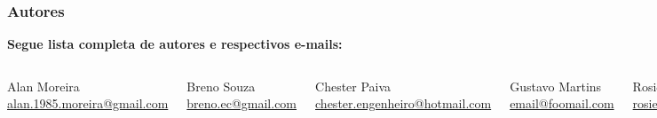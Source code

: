 
\begin{frame}
  \frametitle{Autores}

  \begin{alertblock}{}
    \vspace{5mm}

    \normalsize{\textbf{Segue lista completa de autores e respectivos e-mails:}}
    \vspace{5mm}

    \begin{columns}
      \centering
      \normalsize{Alan Moreira}
      \scriptsize{\href{mailto:alan.1985.moreira@gmail.com}{alan.1985.moreira@gmail.com}}
      \vspace{5mm}

      \normalsize{Breno Souza}
      \scriptsize{\href{mailto:breno.ec@gmail.com}{breno.ec@gmail.com}}
      \vspace{5mm}

      \normalsize{Chester Paiva}
      \scriptsize{\href{mailto:chester.engenheiro@hotmail.com}{chester.engenheiro@hotmail.com}}
      \vspace{5mm}

      \centering
      \normalsize{Gustavo Martins}
      \scriptsize{\href{mailto:email@foomail.com}{email@foomail.com}}
      \vspace{5mm}

      \normalsize{Rosiene Corrêa}
      \scriptsize{\href{mailto:rosienecorrea@yahoo.com.br}{rosienecorrea@yahoo.com.br}}
      \vspace{5mm}

      \normalsize{Vinícius Marinho}
      \scriptsize{\href{mailto:vinicius_marinho@ymail.com}{vinicius\_marinho@ymail.com}}
      \vspace{5mm}
    \end{columns}
  \end{alertblock}

\end{frame}

